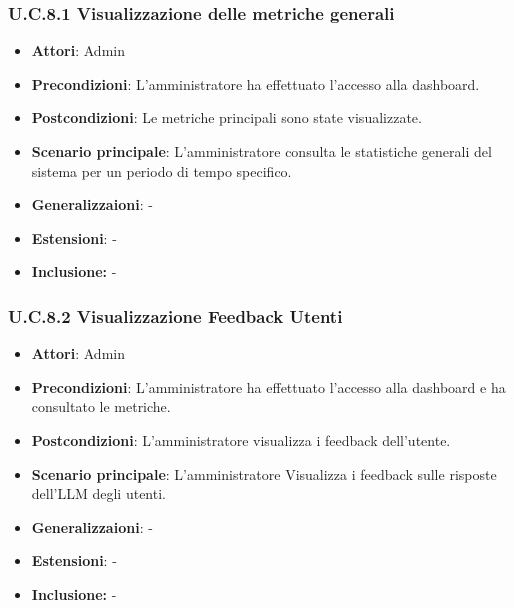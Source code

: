 \subsubsection{U.C.8.1 Visualizzazione delle metriche generali}
\begin{itemize}
    \item \textbf{Attori}: Admin
    \item \textbf{Precondizioni}: L’amministratore ha effettuato l’accesso alla dashboard.
    \item \textbf{Postcondizioni}: Le metriche principali sono state visualizzate.
    \item \textbf{Scenario principale}: L’amministratore consulta le statistiche generali del sistema per un periodo di tempo specifico.
    \item \textbf{Generalizzaioni}: -
    \item \textbf{Estensioni}: -
    \item \textbf{Inclusione:} -
\end{itemize}
\subsubsection{U.C.8.2 Visualizzazione Feedback Utenti}
\begin{itemize}
    \item \textbf{Attori}: Admin
    \item \textbf{Precondizioni}: L’amministratore ha effettuato l’accesso alla dashboard e ha consultato le metriche.
    \item \textbf{Postcondizioni}: L’amministratore visualizza i feedback dell'utente.
    \item \textbf{Scenario principale}: L’amministratore Visualizza i feedback sulle risposte dell’LLM degli utenti.
    \item \textbf{Generalizzaioni}: -
    \item \textbf{Estensioni}: -
    \item \textbf{Inclusione:} -
\end{itemize}
